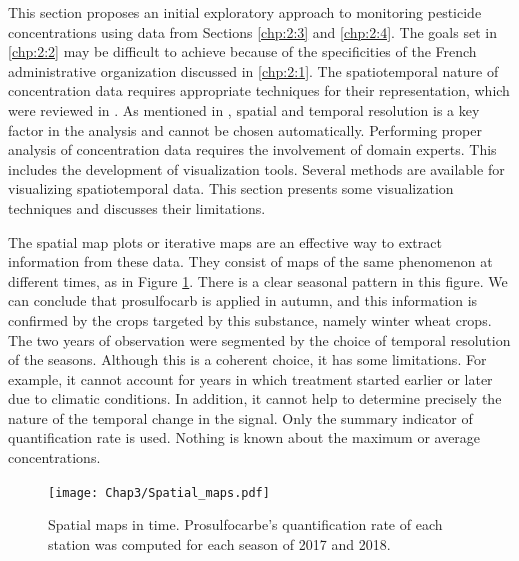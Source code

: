 This section proposes an initial exploratory approach to monitoring pesticide concentrations using data from Sections \ref{chp:2:3} and \ref{chp:2:4}. The goals set in \ref{chp:2:2} may be difficult to achieve because of the specificities of the French administrative organization discussed in \ref{chp:2:1}. The spatiotemporal nature of concentration data requires appropriate techniques for their representation, which were reviewed in \cite{Andrienko2003,cressie2015,Maimon2010}. As mentioned in \cite{Ansari2019}, spatial and temporal resolution is a key factor in the analysis and cannot be chosen automatically. Performing proper analysis of concentration data requires the involvement of domain experts. This includes the development of visualization tools. Several methods are available for visualizing spatiotemporal data. This section presents some visualization techniques and discusses their limitations.

The spatial map plots or iterative maps \cite{Andrienko2003} are an effective way to extract information from these data. They consist of maps of the same phenomenon at different times, as in Figure \ref{fig:spa_ex}. There is a clear seasonal pattern in this figure. We can conclude that prosulfocarb is applied in autumn, and this information is confirmed by the crops targeted by this substance, namely winter wheat crops. The two years of observation were segmented by the choice of temporal resolution of the seasons. Although this is a coherent choice, it has some limitations. For example, it cannot account for years in which treatment started earlier or later due to climatic conditions. In addition, it cannot help to determine precisely the nature of the temporal change in the signal. Only the summary indicator of quantification rate is used. Nothing is known about the maximum or average concentrations.
 
\begin{figure}[ht]
    \centering
    \texttt{[image: Chap3/Spatial\_maps.pdf]}
    \caption{Spatial maps in time. Prosulfocarbe's quantification rate of each station was computed for each season of 2017 and 2018.}
    \label{fig:spa_ex}
\end{figure}

